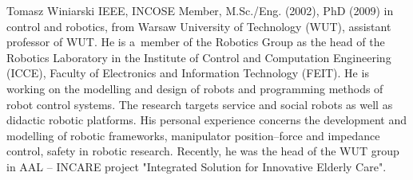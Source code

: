 \documentclass{ieeeaccess}
\begin{document}
		
	\begin{IEEEbiography}{Tomasz Winiarski} IEEE, INCOSE Member, M.Sc./Eng. (2002), PhD (2009) in control and robotics, from Warsaw University of Technology (WUT), assistant professor of WUT. He is a~member of the Robotics Group as the head of the Robotics Laboratory in the Institute of Control and Computation Engineering (ICCE), Faculty of Electronics and Information Technology (FEIT). He is working on the modelling and design of robots and programming methods of robot control systems. The research targets service and social robots as well as didactic robotic platforms. His personal experience concerns the development and modelling of robotic frameworks, manipulator position--force and impedance control, safety in robotic research. Recently, he was the head of the WUT group in AAL -- INCARE project "Integrated Solution for Innovative Elderly Care".
	\end{IEEEbiography}
	
	
	\EOD
	
\end{document}
